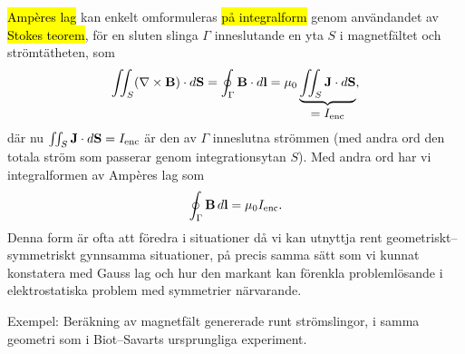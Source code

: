 {{{{\hl{Amp{\`e}res lag}} kan enkelt omformuleras {\hl{p{\aa} integralform}} genom
anv{\"a}ndandet av {\hl{Stokes teorem}},  f{\"o}r en
sluten slinga $\Gamma$ inneslutande en yta $S$ i magnetf{\"a}ltet och
str{\"o}mt{\"a}theten, som
\hl{$$
  \iint_{S}(\nabla\times{\bf B})\cdot d{\bf S}=
  \oint_{\Gamma}{\bf B}\cdot d{\bf l}=
  \mu_0\underbrace{\iint_{S}{\bf J}\cdot d{\bf S}}_{\displaystyle =I_{\rm enc}},
$$}
d{\"a}r nu $\iint_{S}{\bf J}\cdot d{\bf S}=I_{\rm enc}$ {\"a}r den av $\Gamma$
inneslutna str{\"o}mmen (med andra ord den totala str{\"o}m som passerar genom
integrationsytan $S$). Med andra ord har vi integralformen av Amp{\`e}res lag som
$$
  \oint_{\Gamma}{\bf B}\,d{\bf l}=\mu_0I_{\rm enc}.
$$
Denna form {\"a}r ofta att f{\"o}redra i situationer d{\aa} vi kan utnyttja
rent geometriskt--symmetriskt gynn\-samma situationer, p{\aa} precis samma
s{\"a}tt som vi kunnat konstatera med Gauss lag och hur den markant kan
f{\"o}renkla probleml{\"o}sande i elektrostatiska problem med symmetrier
n{\"a}rvarande.

Exempel: Ber{\"a}kning av magnetf{\"a}lt genererade runt str{\"o}mslingor,
i samma geometri som i Biot--Savarts ursprungliga
experiment.
\vfill\eject

}}}
